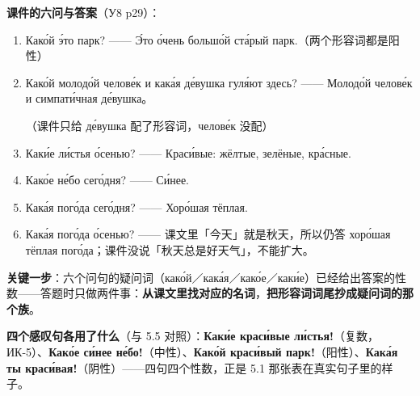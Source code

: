 \textbf{课件的六问与答案}（У8 p29）：

\begin{enumerate}[label=\textbf{(\arabic*)}]
\item Како́й э́то парк? —— Э́то о́чень большо́й ста́рый парк.（两个形容词都是阳性）
\item \sloppy{}Како́й молодо́й челове́к и кака́я де́вушка гуля́ют здесь? —— Молодо́й челове́к и симпати́чная де́вушка。\par （课件只给 де́вушка 配了形容词，челове́к 没配）
\item Каки́е ли́стья о́сенью? —— Краси́вые: жёлтые, зелёные, кра́сные.
\item Како́е не́бо сего́дня? —— Си́нее.
\item Кака́я пого́да сего́дня? —— Хоро́шая тёплая.
\item Кака́я пого́да о́сенью? —— 课文里「今天」就是秋天，所以仍答 хоро́шая тёплая пого́да；课件没说「秋天总是好天气」，不能扩大。
\end{enumerate}

\textbf{关键一步}：六个问句的疑问词（како́й／кака́я／како́е／каки́е）已经给出答案的性数——答题时只做两件事：\textbf{从课文里找对应的名词}，\textbf{把形容词词尾抄成疑问词的那个族}。

\textbf{四个感叹句各用了什么}（与 5.5 对照）：\textbf{Каки́е краси́вые ли́стья!}（复数，ИК-5）、\textbf{Како́е си́нее не́бо!}（中性）、\textbf{Како́й краси́вый парк!}（阳性）、\textbf{Кака́я ты краси́вая!}（阴性）——四句四个性数，正是 5.1 那张表在真实句子里的样子。

